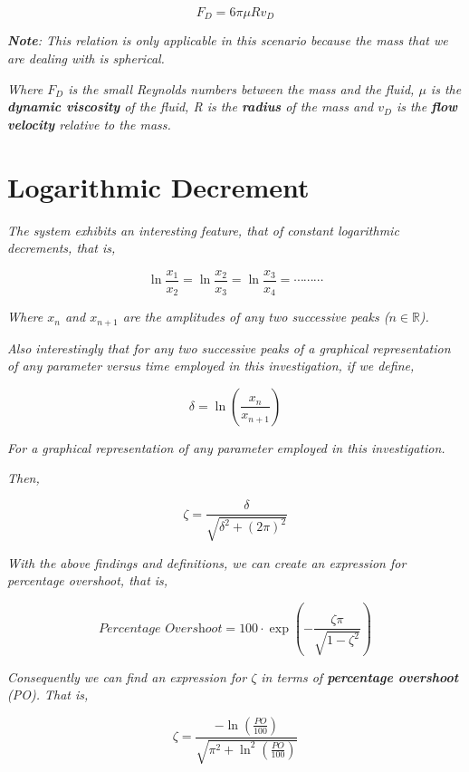         $$F_D = 6\pi\mu Rv_D$$
            
    \textit{\textbf{Note}: This relation is only applicable in this scenario because the mass that we are dealing with is spherical.}
            
    \textit{Where $F_D$ is the small Reynolds numbers between the mass and the fluid, $\mu$ is the \textbf{dynamic viscosity} of the fluid, R is the \textbf{radius} of the mass and $v_D$ is the \textbf{flow velocity} relative to the mass.}
            
\section{{Logarithmic Decrement}}
            
    \textit{The system exhibits an interesting feature, that of constant logarithmic decrements, that is,}
            
        $$\ln{\frac{x_1}{x_2}} = \ln{\frac{x_2}{x_3}} = \ln{\frac{x_3}{x_4}} = \cdots\cdots\cdots$$
            
    \textit{Where $x_n$ and $x_{n + 1}$ are the amplitudes of any two successive peaks ($n \in \mathbb{R}$).}
            
    \textit{Also interestingly that for any two successive peaks of a graphical representation of any parameter versus time employed in this investigation, if we define,}
            
        $$\delta = \ln{\left(\frac{x_n}{x_{n + 1}}\right)}$$
            
    \textit{For a graphical representation of any parameter employed in this investigation.}
            
    \textit{Then,}
            
        $$\zeta = \frac{\delta}{\sqrt{\delta^2 + \left(2\pi\right)^2}}$$
            
    \textit{With the above findings and definitions, we can create an expression for percentage overshoot, that is,}
            
        $$\textit{Percentage Overshoot} = 100\cdot\exp{\left(-\frac{\zeta\pi}{\sqrt{1 - \zeta^2}}\right)}$$
            
    \textit{Consequently we can find an expression for $\zeta$ in terms of \textbf{percentage overshoot} (PO). That is,}
            
        $$\zeta = \frac{-\ln{\left(\frac{PO}{100}\right)}}{\sqrt{\pi^2 + \ln^2{\left(\frac{PO}{100}\right)}}}$$
            
